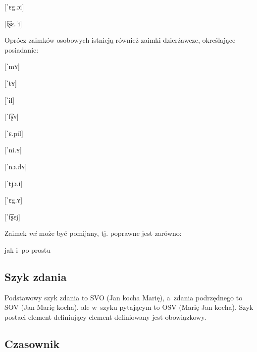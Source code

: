 \begin{spacing}{1.1}
\begin{multicols}{2}
[ˈɛg.ɔi]

[t͡ʂɛ.ˈi]

\end{multicols}

Oprócz zaimków osobowych istnieją również zaimki dzierżawcze, określające 
posiadanie:

\begin{multicols}{2}

[ˈmʏ]

[ˈtʏ]


[ˈil]

[ˈt͡ʂʏ]

[ˈɛ.pil]

[ˈni.ʏ]

[ˈnɔ.dʏ]

[ˈtjɔ.i]

[ˈɛg.ʏ]

[ˈt͡ʂɛj]

\end{multicols}

\noindent
Zaimek \emph{mi} może być pomijany, tj. poprawne jest zarówno: 


\noindent
jak i~po prostu


\subsection{Szyk zdania}

Podstawowy szyk zdania to SVO (Jan kocha Marię), a~zdania podrzędnego to SOV 
(Jan Marię kocha), ale w~szyku pytającym to OSV (Marię Jan kocha). Szyk postaci 
element definiujący-element definiowany jest obowiązkowy.

\subsection{Czasownik}


\end{spacing}

